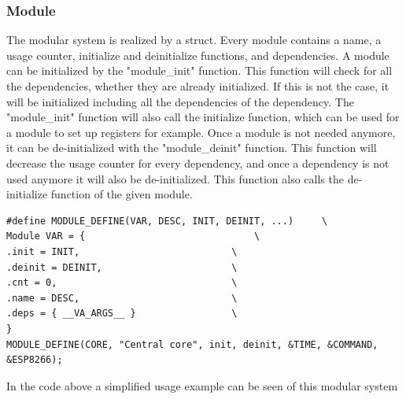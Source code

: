 \subsubsection{Module}
The modular system is realized by a struct. Every module contains a name, a usage counter, initialize and deinitialize functions, and dependencies. A module can be initialized by the "module\_init" function. This function will check for all the dependencies, whether they are already initialized. If this is not the case, it will be initialized including all the dependencies of the dependency. The "module\_init" function will also call the initialize function, which can be used for a module to set up registers for example. Once a module is not needed anymore, it can be de-initialized with the "module\_deinit" function. This function will decrease the usage counter for every dependency, and once a dependency is not used anymore it will also be de-initialized. This function also calls the de-initialize function of the given module.

\begin{verbatim}
#define MODULE_DEFINE(VAR, DESC, INIT, DEINIT, ...)     \
Module VAR = {                          	\
.init = INIT,                           \
.deinit = DEINIT,                       \
.cnt = 0,                               \
.name = DESC,                           \
.deps = { __VA_ARGS__ }                 \
} 
MODULE_DEFINE(CORE, "Central core", init, deinit, &TIME, &COMMAND, &ESP8266);
\end{verbatim}
In the code above a simplified usage example can be seen of this modular system

